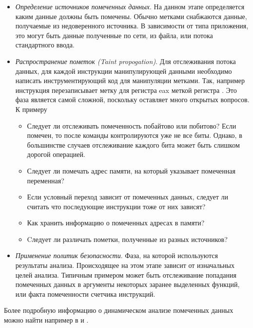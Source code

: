     \begin{itemize}
        \item {\em Определение источников помеченных данных}. На данном этапе определяется каким данные должны быть помечены. Обычно метками снабжаются данные, получаемые из недоверенного
        источника. В зависимости от типа приложения, это могут быть данные полученные по сети, из файла, или потока стандартного ввода.
        \item {\em Распространение пометок (Taint propogation)}. Для отслеживания потока данных, 
        для каждой инструкции манипулирующей данными необходимо написать инструментирующий код для манипуляции метками. Так, например инструкция  перезаписывает метку для регистра eax меткой регистра . Это фаза является самой сложной, поскольку оставляет много открытых вопросов. К примеру
        \begin{itemize}
            \item Следует ли отслеживать помеченность побайтово или побитово? Если  помечен, то после команды  контролируются уже не все биты. Однако, в большинстве случаев отслеживание каждого бита может быть слишком дорогой операцией.
            \item Следует ли помечать адрес памяти, на который указывает помеченная переменная?
            \item Если условный переход зависит от помеченных данных, следует ли считать что последующие инструкции тоже от них зависят?
            \item Как хранить информацию о помеченных адресах в памяти?
            \item Cледует ли различать пометки, полученные из разных источников?
        \end{itemize}
        \item {\em Применение политик безопасности}. Фаза, на которой используются результаты анализа. Происходящее на этом этапе зависит от изначальных целей анализа. Типичным примером может быть отслеживание попадания помеченных данных в аргументы некоторых заранее выделенных функций, или факта помеченности счетчика инструкций.
    \end{itemize}

Более подробную информацию о динамическом анализе помеченных данных можно найти например в \cite{Schwartz} и \cite{PBA}.


